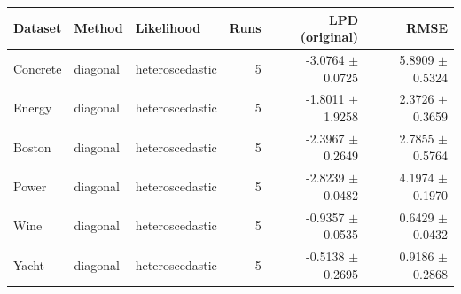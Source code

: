 \begin{tabular}{lllrrr}
\toprule
Dataset & Method & Likelihood & Runs & LPD (original) & RMSE \\
\midrule
Concrete & diagonal & heteroscedastic & 5 & -3.0764 $\pm$ 0.0725 & 5.8909 $\pm$ 0.5324 \\
Energy & diagonal & heteroscedastic & 5 & -1.8011 $\pm$ 1.9258 & 2.3726 $\pm$ 0.3659 \\
Boston & diagonal & heteroscedastic & 5 & -2.3967 $\pm$ 0.2649 & 2.7855 $\pm$ 0.5764 \\
Power & diagonal & heteroscedastic & 5 & -2.8239 $\pm$ 0.0482 & 4.1974 $\pm$ 0.1970 \\
Wine & diagonal & heteroscedastic & 5 & -0.9357 $\pm$ 0.0535 & 0.6429 $\pm$ 0.0432 \\
Yacht & diagonal & heteroscedastic & 5 & -0.5138 $\pm$ 0.2695 & 0.9186 $\pm$ 0.2868 \\
\bottomrule
\end{tabular}
